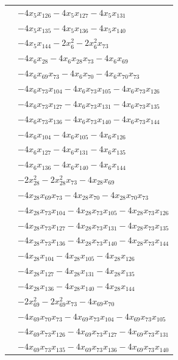 \begin{longtable}{@{}r@{\;}l@{}}
 & \(\displaystyle -4x_{5}x_{126} -4x_{5}x_{127} -4x_{5}x_{131}\) \\
 & \(\displaystyle -4x_{5}x_{135} -4x_{5}x_{136} -4x_{5}x_{140}\) \\
 & \(\displaystyle -4x_{5}x_{144} -2x_{6}^{2} -2x_{6}^{2}x_{73}\) \\
 & \(\displaystyle -4x_{6}x_{28} -4x_{6}x_{28}x_{73} -4x_{6}x_{69}\) \\
 & \(\displaystyle -4x_{6}x_{69}x_{73} -4x_{6}x_{70} -4x_{6}x_{70}x_{73}\) \\
 & \(\displaystyle -4x_{6}x_{73}x_{104} -4x_{6}x_{73}x_{105} -4x_{6}x_{73}x_{126}\) \\
 & \(\displaystyle -4x_{6}x_{73}x_{127} -4x_{6}x_{73}x_{131} -4x_{6}x_{73}x_{135}\) \\
 & \(\displaystyle -4x_{6}x_{73}x_{136} -4x_{6}x_{73}x_{140} -4x_{6}x_{73}x_{144}\) \\
 & \(\displaystyle -4x_{6}x_{104} -4x_{6}x_{105} -4x_{6}x_{126}\) \\
 & \(\displaystyle -4x_{6}x_{127} -4x_{6}x_{131} -4x_{6}x_{135}\) \\
 & \(\displaystyle -4x_{6}x_{136} -4x_{6}x_{140} -4x_{6}x_{144}\) \\
 & \(\displaystyle -2x_{28}^{2} -2x_{28}^{2}x_{73} -4x_{28}x_{69}\) \\
 & \(\displaystyle -4x_{28}x_{69}x_{73} -4x_{28}x_{70} -4x_{28}x_{70}x_{73}\) \\
 & \(\displaystyle -4x_{28}x_{73}x_{104} -4x_{28}x_{73}x_{105} -4x_{28}x_{73}x_{126}\) \\
 & \(\displaystyle -4x_{28}x_{73}x_{127} -4x_{28}x_{73}x_{131} -4x_{28}x_{73}x_{135}\) \\
 & \(\displaystyle -4x_{28}x_{73}x_{136} -4x_{28}x_{73}x_{140} -4x_{28}x_{73}x_{144}\) \\
 & \(\displaystyle -4x_{28}x_{104} -4x_{28}x_{105} -4x_{28}x_{126}\) \\
 & \(\displaystyle -4x_{28}x_{127} -4x_{28}x_{131} -4x_{28}x_{135}\) \\
 & \(\displaystyle -4x_{28}x_{136} -4x_{28}x_{140} -4x_{28}x_{144}\) \\
 & \(\displaystyle -2x_{69}^{2} -2x_{69}^{2}x_{73} -4x_{69}x_{70}\) \\
 & \(\displaystyle -4x_{69}x_{70}x_{73} -4x_{69}x_{73}x_{104} -4x_{69}x_{73}x_{105}\) \\
 & \(\displaystyle -4x_{69}x_{73}x_{126} -4x_{69}x_{73}x_{127} -4x_{69}x_{73}x_{131}\) \\
 & \(\displaystyle -4x_{69}x_{73}x_{135} -4x_{69}x_{73}x_{136} -4x_{69}x_{73}x_{140}\) \\

\end{longtable}
